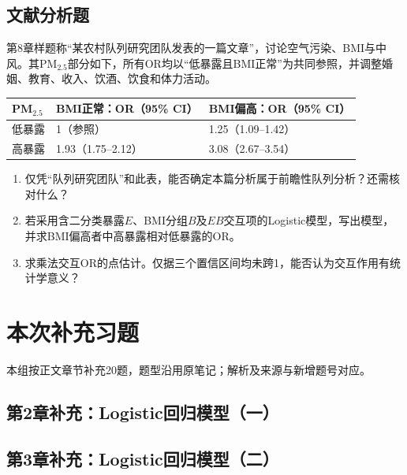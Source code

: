 \par\addvspace{8pt}\noindent\begin{minipage}{\linewidth}

\subsection{文献分析题}


第8章样题称“某农村队列研究团队发表的一篇文章”，讨论空气污染、BMI与中风。其PM\(_{2.5}\)部分如下，所有OR均以“低暴露且BMI正常”为共同参照，并调整婚姻、教育、收入、饮酒、饮食和体力活动。
\begin{center}\small\begin{tabular}{lll}\toprule
PM\(_{2.5}\) & BMI正常：OR（95\% CI） & BMI偏高：OR（95\% CI）\\\midrule
低暴露 & 1（参照） & 1.25（1.09--1.42）\\
高暴露 & 1.93（1.75--2.12） & 3.08（2.67--3.54）\\\bottomrule
\end{tabular}\end{center}
\begin{enumerate}
\item 仅凭“队列研究团队”和此表，能否确定本篇分析属于前瞻性队列分析？还需核对什么？
\item 若采用含二分类暴露\(E\)、BMI分组\(B\)及\(EB\)交互项的Logistic模型，写出模型，并求BMI偏高者中高暴露相对低暴露的OR。
\item 求乘法交互OR的点估计。仅据三个置信区间均未跨1，能否认为交互作用有统计学意义？
\end{enumerate}


\end{minipage}\par\vspace{5pt}


\clearpage\section{本次补充习题}
本组按正文章节补充20题，题型沿用原笔记；解析及来源与新增题号对应。
\subsection*{第2章补充：Logistic回归模型（一）}

\subsection*{第3章补充：Logistic回归模型（二）}


